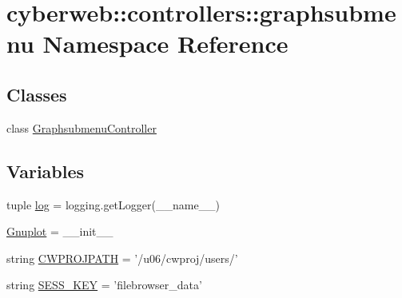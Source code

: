 \hypertarget{namespacecyberweb_1_1controllers_1_1graphsubmenu}{\section{cyberweb\-:\-:controllers\-:\-:graphsubmenu \-Namespace \-Reference}
\label{namespacecyberweb_1_1controllers_1_1graphsubmenu}
}
\subsection*{\-Classes}
\begin{DoxyCompactItemize}
\item 
class \hyperlink{classcyberweb_1_1controllers_1_1graphsubmenu_1_1_graphsubmenu_controller}{\-Graphsubmenu\-Controller}
\end{DoxyCompactItemize}
\subsection*{\-Variables}
\begin{DoxyCompactItemize}
\item 
tuple \hyperlink{namespacecyberweb_1_1controllers_1_1graphsubmenu_ab285ecc7e91eabfb72e6a06339b3ce3b}{log} = logging.\-get\-Logger(\-\_\-\-\_\-name\-\_\-\-\_\-)
\item 
\hyperlink{namespacecyberweb_1_1controllers_1_1graphsubmenu_adcb3c94550c876885b9147144ee10044}{\-Gnuplot} = \-\_\-\-\_\-init\-\_\-\-\_\-
\item 
string \hyperlink{namespacecyberweb_1_1controllers_1_1graphsubmenu_a3eb0c622a616ed38f2218613c9b46200}{\-C\-W\-P\-R\-O\-J\-P\-A\-T\-H} = '/u06/cwproj/users/'
\item 
string \hyperlink{namespacecyberweb_1_1controllers_1_1graphsubmenu_a00f44a06dfacc07f7b6b3d72e3ce4dd6}{\-S\-E\-S\-S\-\_\-\-K\-E\-Y} = 'filebrowser\-\_\-data'
\end{DoxyCompactItemize}


